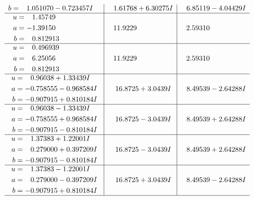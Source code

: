\documentclass[1p]{elsarticle_modified}
\theoremstyle{definition}
\begin{document}
$$\begin{array}{c|c|c}
\begin{aligned}
b &= \phantom{-}1.051070 - 0.723457 I\end{aligned}
 & \phantom{-}1.61768 + 6.30275 I & \phantom{-}6.85119 - 4.04429 I \\ \hline\begin{aligned}
u &= \phantom{-}1.45749\phantom{ +0.000000I} \\
a &= -1.39150\phantom{ +0.000000I} \\
b &= \phantom{-}0.812913\phantom{ +0.000000I}\end{aligned}
 & \phantom{-}11.9229\phantom{ +0.000000I} & \phantom{-}2.59310\phantom{ +0.000000I} \\ \hline\begin{aligned}
u &= \phantom{-}0.496939\phantom{ +0.000000I} \\
a &= \phantom{-}6.25056\phantom{ +0.000000I} \\
b &= \phantom{-}0.812913\phantom{ +0.000000I}\end{aligned}
 & \phantom{-}11.9229\phantom{ +0.000000I} & \phantom{-}2.59310\phantom{ +0.000000I} \\ \hline\begin{aligned}
u &= \phantom{-}0.96038 + 1.33439 I \\
a &= -0.758555 - 0.968584 I \\
b &= -0.907915 + 0.810184 I\end{aligned}
 & \phantom{-}16.8725 + 3.0439 I & \phantom{-}8.49539 - 2.64288 I \\ \hline\begin{aligned}
u &= \phantom{-}0.96038 - 1.33439 I \\
a &= -0.758555 + 0.968584 I \\
b &= -0.907915 - 0.810184 I\end{aligned}
 & \phantom{-}16.8725 - 3.0439 I & \phantom{-}8.49539 + 2.64288 I \\ \hline\begin{aligned}
u &= \phantom{-}1.37383 + 1.22001 I \\
a &= \phantom{-}0.279000 + 0.397209 I \\
b &= -0.907915 - 0.810184 I\end{aligned}
 & \phantom{-}16.8725 - 3.0439 I & \phantom{-}8.49539 + 2.64288 I \\ \hline\begin{aligned}
u &= \phantom{-}1.37383 - 1.22001 I \\
a &= \phantom{-}0.279000 - 0.397209 I \\
b &= -0.907915 + 0.810184 I\end{aligned}
 & \phantom{-}16.8725 + 3.0439 I & \phantom{-}8.49539 - 2.64288 I\\
 \hline 
 \end{array}$$\newpage\newpage\renewcommand{\arraystretch}{1}
\end{document}
